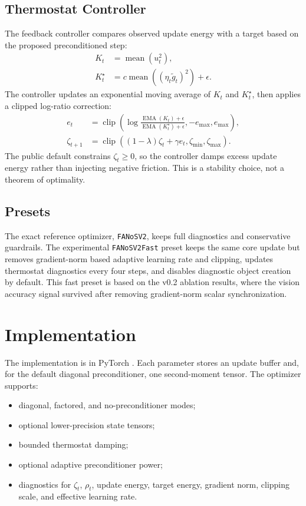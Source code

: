 \documentclass[11pt]{article}
\begin{document}
\subsection{Thermostat Controller}

The feedback controller compares observed update energy with a target based on the proposed preconditioned step:
\begin{align}
K_t &= \operatorname{mean}(u_t^2),\\
K_t^\star &= c\operatorname{mean}((\eta_t\tilde{g}_t)^2)+\epsilon.
\end{align}
The controller updates an exponential moving average of $K_t$ and $K_t^\star$, then applies a clipped log-ratio correction:
\begin{align}
e_t &= \operatorname{clip}\left(
\log\frac{\operatorname{EMA}(K_t)+\epsilon}
{\operatorname{EMA}(K_t^\star)+\epsilon},
-e_{\max},e_{\max}
\right),\\
\zeta_{t+1} &=
\operatorname{clip}\left((1-\lambda)\zeta_t+\gamma e_t,\zeta_{\min},\zeta_{\max}\right).
\end{align}
The public default constrains $\zeta_t\geq 0$, so the controller damps excess update energy rather than injecting negative friction. This is a stability choice, not a theorem of optimality.

\subsection{Presets}

The exact reference optimizer, \texttt{FANoSV2}, keeps full diagnostics and conservative guardrails. The experimental \texttt{FANoSV2Fast} preset keeps the same core update but removes gradient-norm based adaptive learning rate and clipping, updates thermostat diagnostics every four steps, and disables diagnostic object creation by default. This fast preset is based on the v0.2 ablation results, where the vision accuracy signal survived after removing gradient-norm scalar synchronization.

\section{Implementation}

The implementation is in PyTorch \cite{paszke2019pytorch}. Each parameter stores an update buffer and, for the default diagonal preconditioner, one second-moment tensor. The optimizer supports:
\begin{itemize}
\item diagonal, factored, and no-preconditioner modes;
\item optional lower-precision state tensors;
\item bounded thermostat damping;
\item optional adaptive preconditioner power;
\item diagnostics for $\zeta_t$, $\rho_t$, update energy, target energy, gradient norm, clipping scale, and effective learning rate.
\end{itemize}
\end{document}
